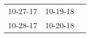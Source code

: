 \begin{supertabular}{p{0.33\columnwidth}p{0.33\columnwidth}p{0.33\columnwidth}}
 10-27-17\textsuperscript{} &  10-19-18\textsuperscript{} \\
 10-28-17\textsuperscript{} &  10-20-18\textsuperscript{} \\
\end{supertabular}

